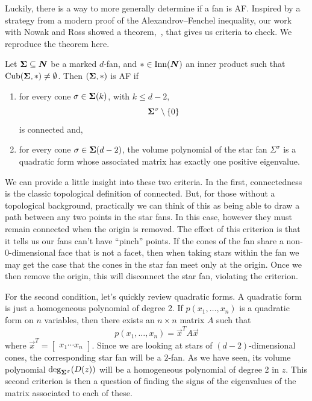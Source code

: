 \documentclass[12pt,oneside]{../../sfsuthesis}
\begin{document}
Luckily, there is a way to more generally determine if a fan is AF\@.
Inspired by a strategy from a modern proof of the Alexandrov--Fenchel inequality, our work with Nowak and Ross showed a theorem,~\cite[Theorem~5.1]{nowakMixedVolumesNormal2023}, that gives us criteria to check.
We reproduce the theorem here.
\begin{theorem}\th\label{thm:suffAF}
    Let \( {\bm{\Sigma}} \subseteq \bm{N} \) be a marked \( d \)-fan, and \( \ast \in \mathrm{Inn}(\bm{N}) \) an inner product such that \( \operatorname{Cub}({\bm{\Sigma}}, \ast) \neq \emptyset \).
    Then \( ({\bm{\Sigma}}, \ast) \) is AF if
    \begin{enumerate}[label=\roman*.]
        \item for every cone \( \sigma \in {\bm{\Sigma}}(k) \), with \( k \leq d - 2 \),
              \[
                  {\bm{\Sigma}}^\sigma \setminus \{ 0 \}
              \]
              is connected and,
        \item for every cone \( \sigma \in {\bm{\Sigma}}(d-2) \), the volume polynomial of the star fan \( \Sigma^\sigma \) is a quadratic form whose associated matrix has exactly one positive eigenvalue.
    \end{enumerate}
\end{theorem}
We can provide a little insight into these two criteria.
In the first, connectedness is the classic topological definition of connected.
But, for those without a topological background, practically we can think of this as being able to draw a path between any two points in the star fans.
In this case, however they must remain connected when  the origin is removed.
The effect of this criterion is that it tells us our fans can't have ``pinch'' points.
If the cones of the fan share a non-0-dimensional face that is not a facet, then when taking stars within the fan we may get the case that the cones in the star fan meet only at the origin.
Once we then remove the origin, this will disconnect the star fan, violating the criterion.

For the second condition, let's quickly review quadratic forms.
A quadratic form is just a homogeneous polynomial of degree 2.
If \( p(x_1, \dots, x_n) \) is a quadratic form on \( n \) variables, then there exists an \( n \times n \) matrix \( A \) such that
\[
    p(x_1, \dots, x_n) = \vec{x}^T A \vec{x}
\]
where \( \vec{x}^T = \begin{bmatrix}
    x_1 \cdots x_n
\end{bmatrix} \).
Since we are looking at stars of \( (d - 2) \)-dimensional cones, the corresponding star fan will be a \( 2 \)-fan.
As we have seen, its volume polynomial \( \deg_{{\bm{\Sigma}}^\sigma}(D(z)) \) will be a homogeneous polynomial of degree 2 in \( z \).
This second criterion is then a question of finding the signs of the eigenvalues of the matrix associated to each of these.
\end{document}
